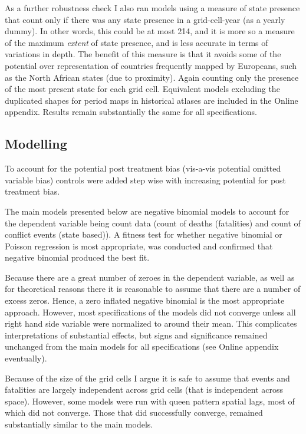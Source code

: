 \documentclass[12pt]{article}
\begin{document}
As a further robustness check I also ran models using a measure of state
presence that count only if there was any state presence in a grid-cell-year (as
a yearly dummy). In other words, this could be at most 214, and it is more so a
measure of the maximum \textit{extent} of state presence, and is less accurate
in terms of variations in depth. The benefit of this measure is that it avoids
some of the potential over representation of countries frequently mapped by
Europeans, such as the North African states (due to proximity). Again counting
only the presence of the most present state for each grid cell. Equivalent
models excluding the duplicated shapes for period maps in historical atlases are
included in the Online appendix. Results remain substantially the same for all
specifications.

\subsection{Modelling}

To account for the potential post treatment bias (vis-a-vis potential omitted
variable bias) controls were added step wise with increasing potential for post
treatment bias.

The main models presented below are negative binomial models to account for the
dependent variable being count data (count of deaths (fatalities) and count of
conflict events (state based)). A fitness test for whether negative binomial or
Poisson regression is most appropriate, was conducted and confirmed that
negative binomial produced the best fit.

Because there are a great number of zeroes in the dependent variable, as well
as for theoretical reasons there it is reasonable to assume that there are a
number of excess zeros. Hence, a zero inflated negative binomial is the most
appropriate approach. However, most specifications of the models did not
converge unless all right hand side variable were normalized to around their
mean. This complicates interpretations of substantial effects, but signs and
significance remained unchanged from the main models for all specifications (see
Online appendix eventually).

Because of the size of the grid cells I argue it is safe to assume that events
and fatalities are largely independent across grid cells (that is independent
across space). However, some models were run with queen pattern spatial lags,
most of which did not converge. Those that did successfully converge, remained
substantially similar to the main models.
\end{document}
